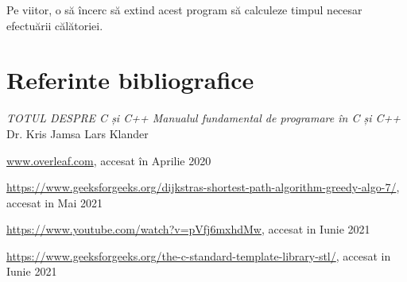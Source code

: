 \documentclass[a4paper]{article}
\begin{document}
Pe viitor, o să încerc să extind acest program să calculeze timpul necesar efectuării călătoriei.

\section{Referinte bibliografice}
\begin{thebibliography}{5}
\emph{TOTUL DESPRE C și C++ Manualul fundamental de programare în C 
și C++} Dr. Kris Jamsa Lars Klander

\url{www.overleaf.com}, accesat în Aprilie 2020

\url{https://www.geeksforgeeks.org/dijkstras-shortest-path-algorithm-greedy-algo-7/}, accesat in Mai 2021

\url{https://www.youtube.com/watch?v=pVfj6mxhdMw}, accesat in Iunie 2021

\url{https://www.geeksforgeeks.org/the-c-standard-template-library-stl/}, accesat in Iunie 2021

\end{thebibliography}
\end{document}
